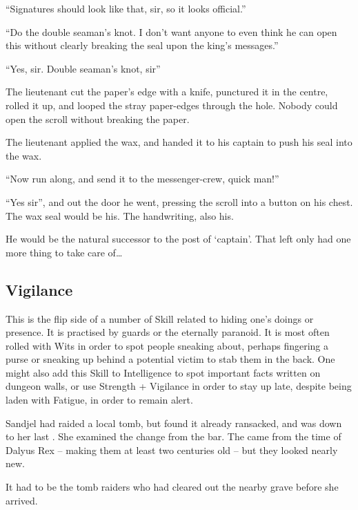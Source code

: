 \begin{multicols}{2}
\begin{exampletext}
  ``Signatures should look like that, sir, so it looks official.''

  ``Do the double seaman's knot.
  I don't want anyone to even think he can open this without clearly breaking the seal upon the king's messages.''

  ``Yes, sir.
  Double seaman's knot, sir''

  The lieutenant cut the paper's edge with a knife, punctured it in the centre, rolled it up, and looped the stray paper-edges through the hole.
  Nobody could open the scroll without breaking the paper.

  The lieutenant applied the wax, and handed it to his captain to push his seal into the wax.

  ``Now run along, and send it to the messenger-crew, quick man!''

  ``Yes sir'', and out the door he went, pressing the scroll into a button on his chest.
  The wax seal would be his.
  The handwriting, also his.

  He would be the natural successor to the post of `captain'.
  That left only had one more thing to take care of\ldots
  
\end{exampletext}

\subsection{Vigilance}

This is the flip side of a number of Skill related to hiding one's doings or presence.
It is practised by guards or the eternally paranoid.
It is most often rolled with Wits in order to spot people sneaking about, perhaps fingering a purse or sneaking up behind a potential victim to stab them in the back.
One might also add this Skill to Intelligence to spot important facts written on dungeon walls, or use Strength + Vigilance in order to stay up late, despite being laden with Fatigue, in order to remain alert.

\ifodd\value{r4}
\begin{exampletext}
  Sandjel had raided a local tomb, but found it already ransacked, and was down to her last .
  She examined the change from the bar.
  The  came from the time of Dalyus Rex -- making them at least two centuries old -- but they looked nearly new.

  It had to be the tomb raiders who had cleared out the nearby grave before she arrived.


\end{exampletext}
\end{multicols}
